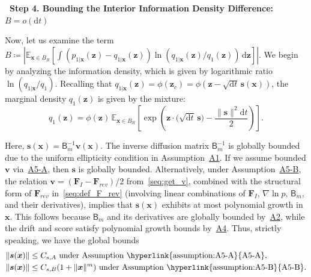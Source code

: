 \documentclass[
 longbibliography,
 twocolumn,
 superscriptaddress,
 amsmath,
 amssymb,
 amsthm,
 amsfonts,
 prl,
 floatfix,
]{revtex4-2}
\newcommand{\matbf}[1]{\boldsymbol{\mathsf{#1}}}
\begin{document}
\begin{widetext}
\noindent\textbf{\textbullet\ Step 4. Bounding the Interior Information Density Difference:} $B=o(\mathrm dt)$

Now, let us examine the term $B\coloneq|\mathbb E_{\bm x\in B_R}[\int (p_{1|\bm x}(\bm z)-q_{1|\bm x}(\bm z))\ln(q_{1|\bm x}(\bm z)/q_1(\bm z))\,\mathrm d\bm z]|$. We begin by analyzing the information density, which is given by logarithmic ratio $\ln(q_{1|\bm x}/q_1)$. Recalling that $q_{1|\bm x}(\bm z)=\phi(\bm z_c)=\phi(\bm z-\sqrt{\mathrm dt}\,\bm s(\bm x))$, the marginal density $q_1(\bm z)$ is given by the mixture:
\begin{equation}
    q_1(\bm z)=\phi(\bm z)\,
    \mathbb E_{\bm x\in B_R}\!\!\left[
    \exp\left(\bm z\cdot\big(\sqrt{\mathrm dt}\,\bm s\big)
    -\frac{\|\bm s\|^2\mathrm dt}{2}
    \right)\right].
    \label{seq:q_1_expression_by_q_1x}
\end{equation}

Here, $\bm s(\bm x)=\matbf B_m^{-1}\bm v(\bm x)$. The inverse diffusion matrix $\matbf B_m^{-1}$ is globally bounded due to the uniform ellipticity condition in Assumption~\hyperlink{assumption:A1}{A1}. If we assume bounded $\bm v$ via~\hyperlink{assumption:A5-A}{A5-A}, then $\bm s$ is globally bounded. Alternatively, under Assumption~\hyperlink{assumption:A5-B}{A5-B}, the relation $\bm v=(\bm F_I-\bm F_{rev})/2$ from~\eqref{seq:get_v}, combined with the structural form of $\bm F_{rev}$ in~\eqref{seq:def_F_rev} (involving linear combinations of $\bm F_I$, $\nabla\ln p$, $\matbf B_m$, and their derivatives), implies that $\bm s(\bm x)$ exhibits at most polynomial growth in $\bm x$. This follows because $\matbf B_m$ and its derivatives are globally bounded by~\hyperlink{assumption:A2}{A2}, while the drift and score satisfy polynomial growth bounds by~\hyperlink{assumption:A4}{A4}. Thus, strictly speaking, we have the global bounds
\begin{subequations}\label{seq:s_bound}
\renewcommand{\theequation}{\theparentequation-\Alph{equation}}
\begin{align}
    \|\bm s(\bm x)\|&\leq C_{s,A}
    \text{ under Assumption~\hyperlink{assumption:A5-A}{A5-A}},
    \label{seq:s_bound_A}
    \\
    \|\bm s(\bm x)\|&\leq C_{s,B}
    (1+\|\bm x\|^m)   
    \text{ under Assumption~\hyperlink{assumption:A5-B}{A5-B}}.
    \label{seq:s_bound_B}
\end{align}
\end{subequations}


\end{widetext}
\end{document}
